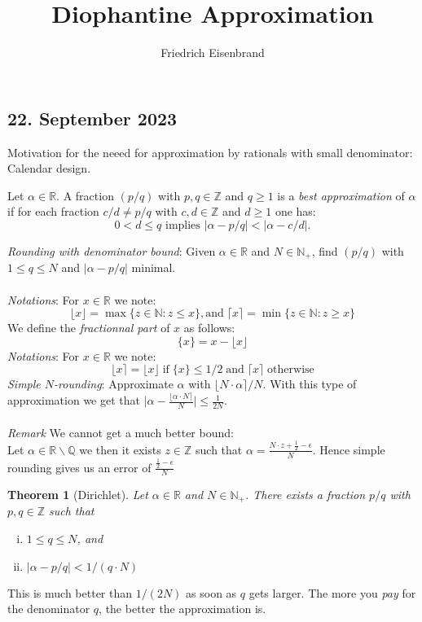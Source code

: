 \documentclass[a4paper,11pt,american]{article}
\title{Diophantine Approximation}
\author{Friedrich Eisenbrand}
\newcommand{\N}{\mathbb{N}}
\newcommand{\Q}{\mathbb{Q}}
\newcommand{\R}{\mathbb{R}}
\newcommand{\Z}{\mathbb{Z}}
\theoremstyle{plain}
\newtheorem{theorem}{Theorem}
\theoremstyle{definition}
\begin{document}
\maketitle



\subsection*{22. September 2023}

Motivation for the neeed for approximation by rationals with small denominator: Calendar design.

Let $\alpha\in\R$. A fraction $(p/q)$ with $p,q\in \Z$ and $q\geq 1$ is a \emph{best approximation} of $\alpha$ if for each fraction $c/d \neq p/q$  with $c,d \in\Z$ and $d\geq1$ one has:
\begin{displaymath}
  0 < d \leq q \text{ implies } \vert \alpha - p/q \vert < \vert\alpha - c/d \vert. 
\end{displaymath}

\emph{Rounding with denominator bound}: Given $\alpha\in\R$ and $N \in \N_+$, find $(p/q)$ with $1\leq q \leq N$ and  $\vert \alpha - p/q\vert $ minimal.\\\\
\emph{Notations}: For $x\in \R$ we note:
\begin{displaymath}
    \lfloor x\rfloor=\max\{z\in\N:z\leq x\},\text{and}\;
    \lceil x\rceil=\min\{z\in\N:z\geq x\}
\end{displaymath}
We define the \emph{fractionnal part} of $x$ as follows:
\begin{displaymath}
    \{x\}=x-\lfloor x\rfloor
\end{displaymath}
\emph{Notations}: For $x\in \R$ we note:
\begin{displaymath}
    \lfloor x\rceil=\lfloor x\rfloor\;\text{if}\; \{x\}\leq 1/2\; \text{and}\; \lceil x\rceil\; \text{otherwise}
\end{displaymath}
\emph{Simple $N$-rounding}: Approximate $\alpha$ with $ \lfloor N \cdot \alpha \rceil / N$. With this type of approximation we get that $\vert \alpha-\frac{\lfloor \alpha\cdot N\rceil}{N}\vert \leq\frac{1}{2N}$.\\\\
\emph{Remark} We cannot get a much better bound:\\
Let $\alpha\in \R\backslash\Q$ we then it exists $z\in \Z$ such that $\alpha=\frac{N\cdot z +\frac{1}{2}-\epsilon}{N}$. Hence simple rounding gives us an error of $\frac{\frac{1}{2}-\epsilon}{N}$
\begin{theorem}[Dirichlet]
  \label{thr:1}
  Let  $\alpha\in \R$ and  $N \in \N_+$. There exists a fraction $p/q$ with $p,q\in\Z $ such that
  \begin{enumerate}[i)]
  \item $1 \leq q \leq N$, and
  \item $\vert \alpha - p/q\vert < 1/(q\cdot N)$ 
  \end{enumerate}
\end{theorem}
  This is much better than $1/(2N)$ as soon as $q$ gets larger. The more you \emph{pay} for the denominator $q$, the better the approximation is.
\end{document}
